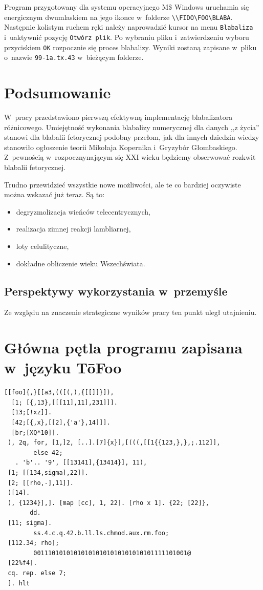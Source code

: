 \documentclass[licencjacka]{pracamgr}
\begin{document}
Program przygotowany dla systemu operacyjnego M\$ Windows uruchamia
się energicznym dwumlaskiem na jego ikonce w~folderze
\verb+\\FIDO\FOO\BLABA+.  Następnie kolistym ruchem ręki należy
naprowadzić kursor na menu \texttt{Blabaliza} i~uaktywnić pozycję
\texttt{Otwórz plik}.  Po wybraniu pliku i~zatwierdzeniu wyboru
przyciskiem \texttt{OK} rozpocznie się proces blabalizy.  Wyniki
zostaną zapisane w~pliku o~nazwie \texttt{99-1a.tx.43} w~bieżącym
folderze.

\chapter{Podsumowanie}

W~pracy przedstawiono pierwszą efektywną implementację blabalizatora
różnicowego.  Umiejętność wykonania blabalizy numerycznej dla danych
,,z życia'' stanowi dla blabalii fetorycznej podobny przełom, jak dla
innych dziedzin wiedzy stanowiło ogłoszenie teorii Mikołaja Kopernika
i~Gryzybór Głombaskiego.  Z~pewnością w~rozpocznynającym się XXI wieku
będziemy obserwować rozkwit blabalii fetorycznej.

Trudno przewidzieć wszystkie nowe możliwości, ale te co bardziej
oczywiste można wskazać już teraz.  Są to:
\begin{itemize}
\item degryzmolizacja wieńców telecentrycznych,
\item realizacja zimnej reakcji lambliarnej,
\item loty celulityczne,
\item dokładne obliczenie wieku Wszechświata.
\end{itemize}

\section{Perspektywy wykorzystania w~przemyśle}

Ze względu na znaczenie strategiczne wyników pracy ten punkt uległ
utajnieniu.

\appendix

\chapter{Główna pętla programu zapisana w~języku T\=oFoo}

\begin{verbatim}
[[foo]{,}[[a3,(([(,),{[[]]}]),
  [1; [{,13},[[[11],11],231]]].
  [13;[!xz]].
  [42;[{,x},[[2],{'a'},14]]].
  [br;[XQ*10]].
 ), 2q, for, [1,]2, [..].[7]{x}],[(((,[[1{{123,},},;.112]],
        else 42;
   . 'b'.. '9', [[13141],{13414}], 11),
 [1; [[134,sigma],22]].
 [2; [[rho,-],11]].
 )[14].
 ), {1234}],]. [map [cc], 1, 22]. [rho x 1]. {22; [22]},
       dd.
 [11; sigma].
        ss.4.c.q.42.b.ll.ls.chmod.aux.rm.foo;
 [112.34; rho];
        001110101010101010101010101010101111101001@
 [22%f4].
 cq. rep. else 7;
 ]. hlt
\end{verbatim}
\end{document}
